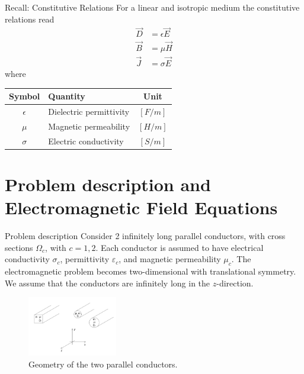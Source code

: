 \documentclass[aspectratio=54,xcolor=dvipsnames]{beamer}
\begin{document}
\begin{frame}{Recall: Constitutive Relations}
    For a linear and isotropic medium the constitutive relations read
    \begin{align*}
        \vec{D} &= \epsilon \vec{E} \\
        \vec{B} &= \mu \vec{H} \\
        \vec{J} &= \sigma \vec{E}
    \end{align*}
    \vspace{0.5em}
    where
    \begin{center}
    \begin{tabular}{|c|l|c|}
        \hline
        Symbol & Quantity & Unit \\
        \hline
        $\epsilon$ & Dielectric permittivity & $[F/m]$ \\
        $\mu$ & Magnetic permeability & $[H/m]$ \\
        $\sigma$ & Electric conductivity & $[S/m]$ \\
        \hline
    \end{tabular}
    \end{center}
\end{frame}

\section{Problem description and Electromagnetic Field Equations}
\begin{frame}{Problem description}
    Consider 2 infinitely long parallel conductors, with cross sections $\Omega_c$, with $c=1,2$. Each conductor is assumed to have electrical conductivity $\sigma_c$, permittivity $\varepsilon_c$, and magnetic permeability $\mu_c$. The electromagnetic problem becomes two-dimensional with translational symmetry. We assume that the conductors are infinitely long in the $z$-direction.
        \begin{figure}[h]
            \centering
            \includegraphics[width=0.35\textwidth]{Images/Conductors_figure.png}
            \caption{Geometry of the two parallel conductors.}
            \label{fig:conductors}
        \end{figure}
\end{frame}
\end{document}
